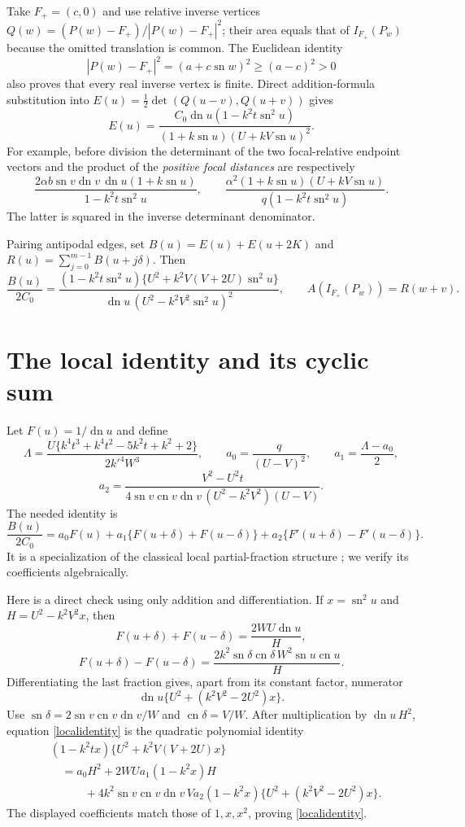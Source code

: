 \documentclass[11pt,letterpaper]{article}
\DeclareMathOperator{\sn}{sn}
\DeclareMathOperator{\cn}{cn}
\DeclareMathOperator{\dn}{dn}
\begin{document}
Take $F_+=(c,0)$ and use relative inverse vertices
$Q(w)=(P(w)-F_+)/|P(w)-F_+|^2$; their area equals that of
$I_{F_+}(P_w)$ because the omitted translation is common.
The Euclidean identity
\[
 |P(w)-F_+|^2=(a+c\sn w)^2\ge(a-c)^2>0
\]
also proves that every real inverse vertex is finite. Direct
addition-formula substitution into
$E(u)=\tfrac12\det(Q(u-v),Q(u+v))$ gives
\begin{equation}\label{edge}
 E(u)=\frac{C_0\dn u(1-k^2t\sn^2u)}
 {(1+k\sn u)(U+kV\sn u)^2}.
\end{equation}
For example, before division the determinant of the two focal-relative endpoint
vectors and the product of the \emph{positive focal distances} are respectively
\[
 \frac{2\alpha b\sn v\dn v\,\dn u(1+k\sn u)}
 {1-k^2t\sn^2u},\qquad
 \frac{\alpha^2(1+k\sn u)(U+kV\sn u)}
 {q(1-k^2t\sn^2u)}.
\]
The latter is squared in the inverse determinant denominator.

Pairing antipodal edges, set $B(u)=E(u)+E(u+2K)$ and
$R(u)=\sum_{j=0}^{m-1}B(u+j\delta)$. Then
\begin{equation}\label{pair}
 \frac{B(u)}{2C_0}=
 \frac{(1-k^2t\sn^2u)\{U^2+k^2V(V+2U)\sn^2u\}}
 {\dn u\,(U^2-k^2V^2\sn^2u)^2},
 \qquad A(I_{F_+}(P_w))=R(w+v).
\end{equation}

\section{The local identity and its cyclic sum}
Let $F(u)=1/\dn u$ and define
\[
 \Lambda=
 \frac{U\{k^4t^3+k^4t^2-5k^2t+k^2+2\}}{2k'^4W^3},
 \qquad
 a_0=\frac{q}{(U-V)^2},\qquad a_1=\frac{\Lambda-a_0}{2},
\]
\[
 a_2=\frac{V^2-U^2t}
 {4\sn v\cn v\dn v\,(U^2-k^2V^2)(U-V)}.
\]
The needed identity is
\begin{equation}\label{localidentity}
 \frac{B(u)}{2C_0}
 =a_0F(u)+a_1\{F(u+\delta)+F(u-\delta)\}
       +a_2\{F'(u+\delta)-F'(u-\delta)\}.
\end{equation}
It is a specialization of the classical local partial-fraction
structure \cite{local}; we verify its coefficients algebraically.

Here is a direct check using only addition and differentiation.
If $x=\sn^2u$ and $H=U^2-k^2V^2x$, then
\[
 F(u+\delta)+F(u-\delta)=\frac{2WU\dn u}{H},
\]
\[
 F(u+\delta)-F(u-\delta)
 =\frac{2k^2\sn\delta\cn\delta\,W^2\sn u\cn u}{H}.
\]
Differentiating the last fraction gives, apart from its constant
factor, numerator
\[
 \dn u\{U^2+(k^2V^2-2U^2)x\}.
\]
Use $\sn\delta=2\sn v\cn v\dn v/W$ and $\cn\delta=V/W$.
After multiplication by $\dn u\,H^2$, equation
\eqref{localidentity} is the quadratic polynomial identity
\begin{align*}
 &(1-k^2tx)\{U^2+k^2V(V+2U)x\}\\
 &\quad=a_0H^2+2WU a_1(1-k^2x)H\\
 &\qquad\quad+
 4k^2\sn v\cn v\dn v\,V a_2
 (1-k^2x)\{U^2+(k^2V^2-2U^2)x\}.
\end{align*}
The displayed coefficients match those of $1,x,x^2$, proving
\eqref{localidentity}.
\end{document}
